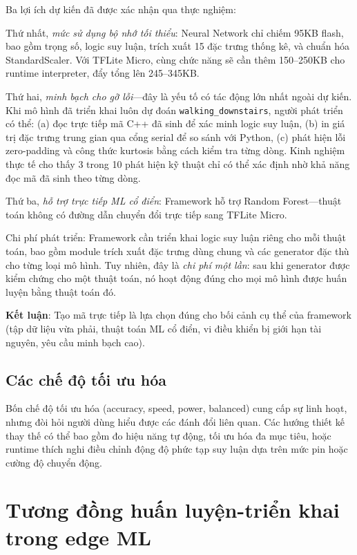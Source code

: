 Ba lợi ích dự kiến đã được xác nhận qua thực nghiệm:

Thứ nhất, \textit{mức sử dụng bộ nhớ tối thiểu}: Neural Network chỉ chiếm 95KB flash, bao gồm trọng số, logic suy luận, trích xuất 15 đặc trưng thống kê, và chuẩn hóa StandardScaler. Với TFLite Micro, cùng chức năng sẽ cần thêm 150--250KB cho runtime interpreter, đẩy tổng lên 245--345KB.

Thứ hai, \textit{minh bạch cho gỡ lỗi}---đây là yếu tố có tác động lớn nhất ngoài dự kiến. Khi mô hình đã triển khai luôn dự đoán \texttt{walking\_downstairs}, người phát triển có thể: (a) đọc trực tiếp mã C++ đã sinh để xác minh logic suy luận, (b) in giá trị đặc trưng trung gian qua cổng serial để so sánh với Python, (c) phát hiện lỗi zero-padding và công thức kurtosis bằng cách kiểm tra từng dòng. Kinh nghiệm thực tế cho thấy 3 trong 10 phát hiện kỹ thuật chỉ có thể xác định nhờ khả năng đọc mã đã sinh theo từng dòng.

Thứ ba, \textit{hỗ trợ trực tiếp ML cổ điển}: Framework hỗ trợ Random Forest---thuật toán không có đường dẫn chuyển đổi trực tiếp sang TFLite Micro.

Chi phí phát triển: Framework cần triển khai logic suy luận riêng cho mỗi thuật toán, bao gồm module trích xuất đặc trưng dùng chung và các generator đặc thù cho từng loại mô hình. Tuy nhiên, đây là \textit{chi phí một lần}: sau khi generator được kiểm chứng cho một thuật toán, nó hoạt động đúng cho mọi mô hình được huấn luyện bằng thuật toán đó.

\textbf{Kết luận}: Tạo mã trực tiếp là lựa chọn đúng cho bối cảnh cụ thể của framework (tập dữ liệu vừa phải, thuật toán ML cổ điển, vi điều khiển bị giới hạn tài nguyên, yêu cầu minh bạch cao).

\subsection{Các chế độ tối ưu hóa}
Bốn chế độ tối ưu hóa (accuracy, speed, power, balanced) cung cấp sự linh hoạt, nhưng đòi hỏi người dùng hiểu được các đánh đổi liên quan. Các hướng thiết kế thay thế có thể bao gồm đo hiệu năng tự động, tối ưu hóa đa mục tiêu, hoặc runtime thích nghi điều chỉnh động độ phức tạp suy luận dựa trên mức pin hoặc cường độ chuyển động.

\section{Tương đồng huấn luyện-triển khai trong edge ML}
\label{sec:training_deployment_parity}

